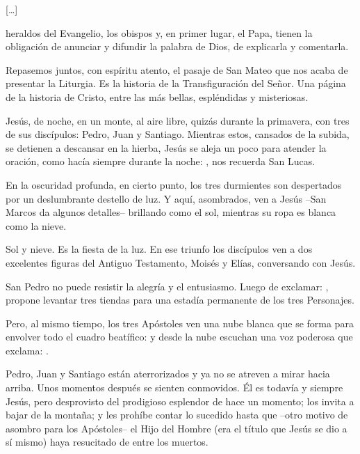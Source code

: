 \begin{body}

[\ldots]

 heraldos del Evangelio, los obispos y, en primer lugar, el Papa, tienen la obligación de anunciar y difundir la palabra de Dios, de explicarla y comentarla.

Repasemos juntos, con espíritu atento, el pasaje de San Mateo que nos acaba de presentar la Liturgia. Es la historia de la Transfiguración del Señor. Una página de la historia de Cristo, entre las más bellas, espléndidas y misteriosas.

Jesús, de noche, en un monte, al aire libre, quizás durante la primavera, con tres de sus discípulos: Pedro, Juan y Santiago. Mientras estos, cansados de la subida, se detienen a descansar en la hierba, Jesús se aleja un poco para atender la oración, como hacía siempre durante la noche: , nos recuerda San Lucas.

En la oscuridad profunda, en cierto punto, los tres durmientes son despertados por un deslumbrante destello de luz. Y aquí, asombrados, ven a Jesús –San Marcos da algunos detalles– brillando como el sol, mientras su ropa es blanca como la nieve.

Sol y nieve. Es la fiesta de la luz. En ese triunfo los discípulos ven a dos excelentes figuras del Antiguo Testamento, Moisés y Elías, conversando con Jesús.

San Pedro no puede resistir la alegría y el entusiasmo. Luego de exclamar: , propone levantar tres tiendas para una estadía permanente de los tres Personajes.

Pero, al mismo tiempo, los tres Apóstoles ven una nube blanca que se forma para envolver todo el cuadro beatífico: y desde la nube escuchan una voz poderosa que exclama: .

Pedro, Juan y Santiago están aterrorizados y ya no se atreven a mirar hacia arriba. Unos momentos después se sienten conmovidos. Él es todavía y siempre Jesús, pero desprovisto del prodigioso esplendor de hace un momento; los invita a bajar de la montaña; y les prohíbe contar lo sucedido hasta que –otro motivo de asombro para los Apóstoles– el Hijo del Hombre (era el título que Jesús se dio a sí mismo) haya resucitado de entre los muertos.



\end{body}
